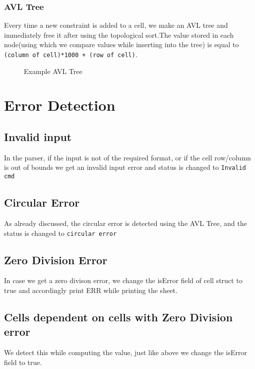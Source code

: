 \documentclass{article}
\begin{document}
\subsubsection{AVL Tree}
    Every time a new constraint is added to a cell, we make an AVL tree and immediately free it after using the topological sort.The value stored in each node(using which we compare values while inserting into the tree) is equal to \texttt{(column of cell)*1000 + (row of cell)}.

    \begin{figure}[H]
        \centering
        \caption{Example AVL Tree}
        \label{fig:enter-label}
    \end{figure}

    
\section{Error Detection}
    \subsection{Invalid input}
        In the parser, if the input is not of the required format, or if the cell row/column is out of bounds we get an invalid input error and status is changed to \texttt{Invalid cmd}

    \subsection{Circular Error}
        As already discussed, the circular error is detected using the AVL Tree, and the status is changed to \texttt{circular error}

    \subsection{Zero Division Error}
        In case we get a zero divison error, we change the isError field of cell struct to true and accordingly print ERR while printing the sheet.

    \subsection{Cells dependent on cells with Zero Division error}
        We detect this while computing the value, just like above we change the isError field to true.
    
    
\end{document}
